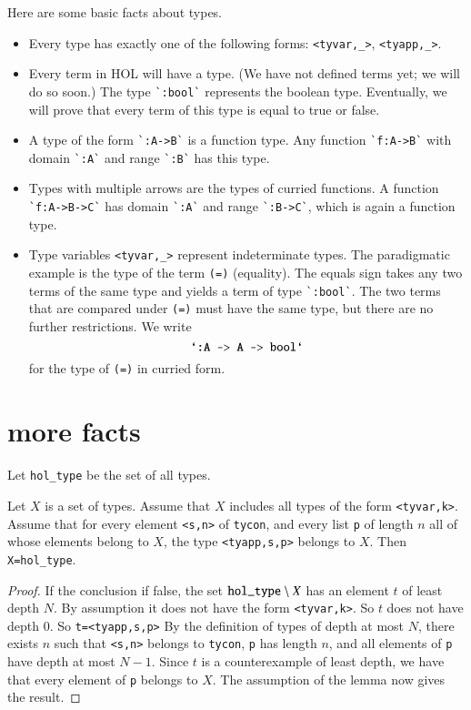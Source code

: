 Here are some basic facts about types.
\begin{itemize}
\item Every type has exactly one of the following forms:
\verb!<tyvar,_>!, \verb!<tyapp,_>!.
\item Every term in HOL will have a type. (We have not defined terms yet; we will do so soon.)
The type \verb!`:bool`! represents the boolean type.  Eventually, we will prove that every term of this type is equal to true or false.
\item A type of the form \verb!`:A->B`! is a function type.  Any function \verb!`f:A->B`! with domain \verb!`:A`! and range \verb!`:B`! has this type.
\item Types with multiple arrows are the types of curried functions.  A function \verb!`f:A->B->C`! has domain \verb!`:A`! and range \verb!`:B->C`!, which is again a function type.
\item Type variables \verb!<tyvar,_>! represent indeterminate types.   The paradigmatic example is the type of the term \verb!(=)! (equality).  The equals sign takes any two terms of the same type and yields a term of type \verb!`:bool`!.  The two terms that are compared under \verb!(=)! must have the same type, but there are no further restrictions.  We write
$$
\verb!`:A -> A -> bool`!
$$
for the type of \verb!(=)! in curried form.
\end{itemize}



\section{more facts}

Let \verb!hol_type! be the set of all types.


\begin{lemma}[induction]  Let $X$ is a set of types. Assume that $X$ includes all types of the form \verb!<tyvar,k>!.  Assume that for every element \verb!<s,n>! of \verb!tycon!, and every list \verb!p! of length $n$ all of whose elements belong to $X$, the type \verb!<tyapp,s,p>! belongs to $X$.  Then \verb!X=hol_type!.
\end{lemma}

\begin{proof} If the conclusion if false, the set $\verb!hol_type!\setminus X$ has an element $t$ of least depth $N$.  By assumption it does not have the form \verb!<tyvar,k>!.  So $t$ does not have depth $0$.  So \verb!t=<tyapp,s,p>!   By the definition of types of depth at most $N$, there exists $n$ such that \verb!<s,n>! belongs to \verb!tycon!, \verb!p! has length $n$, and all elements of \verb!p! have depth at most $N-1$.  Since $t$ is a counterexample of least depth, we have that every element of \verb!p! belongs to $X$.  The assumption of the lemma now gives the result.
\end{proof}



